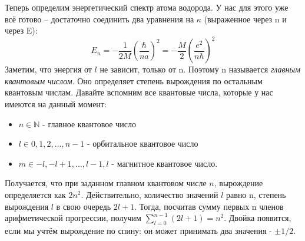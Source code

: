 Теперь определим энергетический спектр атома водорода. У нас для этого уже всё готово -- достаточно соединить два уравнения на $\kappa$ (выраженное через n и через E):
\[
E_n = -\frac{1}{2M}\left(\frac{\hbar}{na}\right)^2 = -\frac{M}{2}\left(\frac{e^2}{n\hbar}\right)^2
\]
Заметим, что энергия от $l$ не зависит, только от n. Поэтому n называется \textit{главным квантовым числом}. Оно определяет степень вырождения по остальным квантовым числам. Давайте вспомним все квантовые числа, которые у нас имеются на данный момент:
\begin{itemize}
    \item $n \in \mathbb{N}$ - главное квантовое число
    \item $l \in {0, 1, 2, ..., n-1}$ - орбитальное квантовое число
    \item $m \in {-l, -l+1, ... , l-1, l}$ - магнитное квантовое число.
\end{itemize}
Получается, что при заданном главном квантовом числе $n$, вырождение определяется как $2n^2$. Действительно, количество значений $l$ равно n, степень вырождения $l$ в свою очередь $2l+1$. Тогда, посчитав сумму первых n членов арифметической прогрессии, получим $\sum\limits_{l=0}^{n-1}(2l +1 ) = n^2$. Двойка появится, если мы учтём вырождение по спину: он может принимать два значения - $\pm 1/2$.

